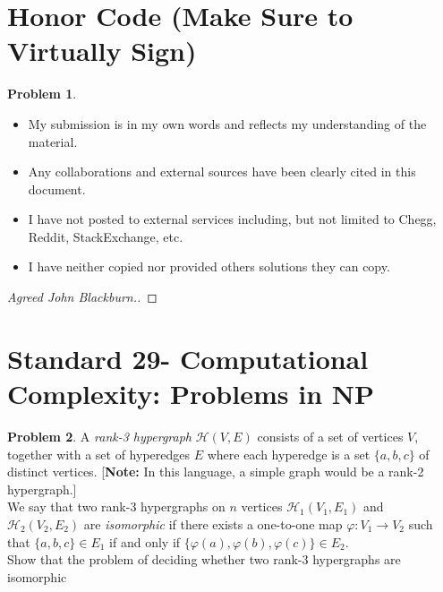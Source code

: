 \documentclass[11pt]{article}
\theoremstyle{definition}
\theoremstyle{definition}
\newtheorem{required}{Problem}
\theoremstyle{definition}
\begin{document}
\section{Honor Code (Make Sure to Virtually Sign)} \label{HonorCode}

\begin{required}
\begin{itemize}
\item My submission is in my own words and reflects my understanding of the material.
\item Any collaborations and external sources have been clearly cited in this document.
\item I have not posted to external services including, but not limited to Chegg, Reddit, StackExchange, etc.
\item I have neither copied nor provided others solutions they can copy.
\end{itemize}

\end{required}

\begin{proof}[Agreed John Blackburn.]
\end{proof}


\newpage
\section{Standard 29- Computational Complexity: Problems in \textsf{NP}}
\begin{required}
A \textit{rank-3 hypergraph} $\mathcal{H}(V, E)$ consists of a set of vertices $V$, together with a set of hyperedges $E$ where each hyperedge is a set $\{a, b, c\}$ of distinct vertices. [\textbf{Note:} In this language, a simple graph would be a rank-2 hypergraph.] \\

\noindent We say that two rank-3 hypergraphs on $n$ vertices $\mathcal{H}_{1}(V_{1}, E_{1})$ and $\mathcal{H}_{2}(V_{2}, E_{2})$ are \textit{isomorphic} if there exists a one-to-one map $\varphi : V_{1} \to V_{2}$ such that $\{a, b, c\} \in E_{1}$ if and only if $\{ \varphi(a), \varphi(b), \varphi(c) \} \in E_{2}$.  \\

\noindent Show that the problem of deciding whether two rank-3 hypergraphs are isomorphic
\end{required}
\end{document}
